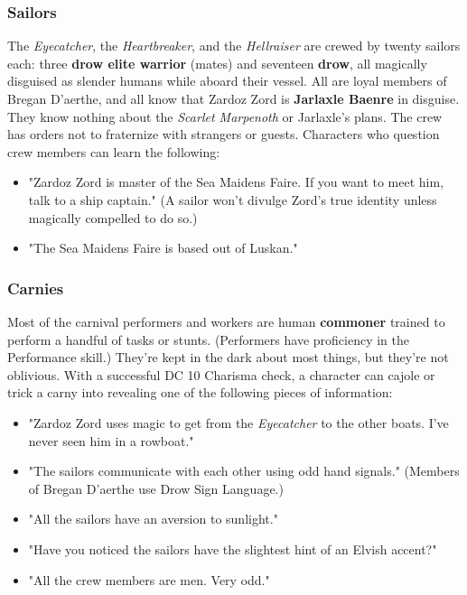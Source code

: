 \documentclass[10pt,a4paper,twoside,twocolumn,openany,nodeprecatedcode]{dndbook}
\begin{document}
\subsubsection{Sailors}
The \textit{Eyecatcher}, the \textit{Heartbreaker}, and the \textit{Hellraiser} are crewed by twenty sailors each: three \textbf{drow elite warrior} (mates) and seventeen \textbf{drow}, all magically disguised as slender humans while aboard their vessel. All are loyal members of Bregan D'aerthe, and all know that Zardoz Zord is \textbf{Jarlaxle Baenre} in disguise. They know nothing about the \textit{Scarlet Marpenoth} or Jarlaxle's plans.
The crew has orders not to fraternize with strangers or guests. Characters who question crew members can learn the following:
\begin{itemize}

\item "Zardoz Zord is master of the Sea Maidens Faire. If you want to meet him, talk to a ship captain." (A sailor won't divulge Zord's true identity unless magically compelled to do so.)
\item "The Sea Maidens Faire is based out of Luskan."
\end{itemize}


\subsubsection{Carnies}
Most of the carnival performers and workers are human \textbf{commoner} trained to perform a handful of tasks or stunts. (Performers have proficiency in the Performance skill.) They're kept in the dark about most things, but they're not oblivious. With a successful DC 10 Charisma check, a character can cajole or trick a carny into revealing one of the following pieces of information:
\begin{itemize}

\item "Zardoz Zord uses magic to get from the \textit{Eyecatcher} to the other boats. I've never seen him in a rowboat."
\item "The sailors communicate with each other using odd hand signals." (Members of Bregan D'aerthe use Drow Sign Language.)
\item "All the sailors have an aversion to sunlight."
\item "Have you noticed the sailors have the slightest hint of an Elvish accent?"
\item "All the crew members are men. Very odd."
\end{itemize}
\end{document}
